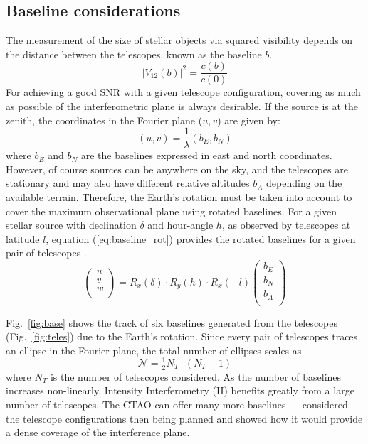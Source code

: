 \subsection{Baseline considerations}
The measurement of the size of stellar objects via squared visibility depends on the distance between the telescopes, known as the baseline $b$.
\begin{equation}
	|V_{12}(b)|^2 = \frac{c(b)}{c(0)}
	\label{eq:angular_size_meas}
\end{equation}
For achieving a good SNR with a given telescope configuration, covering as much as possible of the interferometric plane is always desirable. If the source is at the zenith, the coordinates in the Fourier plane ($u,v$) are given by:
\begin{equation}
	(u,v) = \frac{1}{\lambda} (b_E, b_N)
\end{equation}
where $b_E$ and $b_N$ are the baselines expressed in east and north coordinates. However, of course sources can be anywhere on the sky, and the telescopes are stationary and may also have different relative altitudes $b_A$ depending on the available terrain. Therefore, the Earth's rotation must be taken into account to cover the maximum observational plane using rotated baselines. For a given stellar source with declination $\delta$ and hour-angle $h$, as observed by telescopes at latitude $l$, equation (\ref{eq:baseline_rot}) provides the rotated baselines for a given pair of telescopes \citep[see e.g., eqs.~8--10 from][]{2020MNRAS.498.4577B}.
\begin{equation}
\begin{pmatrix} u\\ v\\ w\\ \end{pmatrix} = R_x(\delta) \cdot R_y(h) \cdot R_x(-l) \begin{pmatrix} b_E \\ b_N \\ b_A \\ \end{pmatrix}
	\label{eq:baseline_rot}
\end{equation}

Fig.~\ref{fig:base} shows the track of six baselines generated from the telescopes (Fig.~\ref{fig:teles}) due to the Earth's rotation. Since every pair of telescopes traces an ellipse in the Fourier plane, the total number of ellipses scales as
\begin{equation}
	\label{eq:N_telescopes}
	\mathcal{N} = \tfrac12 N_T \cdot (N_T -1)
\end{equation}
where $N_T$ is the number of telescopes considered.
As the number of baselines increases non-linearly, Intensity Interferometry (II) benefits greatly from a large number of telescopes. The CTAO can offer many more baselines --- \cite{2013APh....43..331D} considered the telescope configurations then being planned and showed how it would provide a dense coverage of the interference plane.

